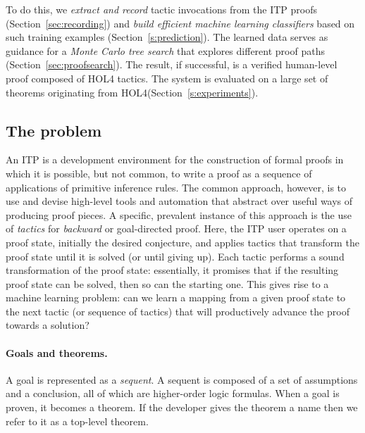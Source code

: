 \documentclass[runningheads,a4paper,draft]{svjour3}
\def\holfour{\textsf{HOL4}\xspace}
\begin{document}
  To do this, we \emph{extract and record} tactic invocations from the ITP
  proofs (Section~\ref{sec:recording}) and
  \emph{build efficient machine learning classifiers} based on such training
  examples (Section~\ref{s:prediction}).  The learned data serves as
  guidance for a \emph{Monte Carlo tree search} that explores different
  proof paths (Section~\ref{sec:proofsearch}). The result, if
  successful, is a verified human-level proof composed of \holfour
  tactics.  The system is evaluated on a large set of theorems originating
  from \holfour (Section~\ref{s:experiments}).

\subsection{The problem}
An ITP is a development environment for the construction of formal proofs in which it is possible, but not common, to write a proof as a sequence of applications of primitive inference rules.
The common approach, however, is to use and devise high-level tools and automation that abstract over useful ways of producing proof pieces.
A specific, prevalent instance of this approach is the use of \emph{tactics} for \emph{backward} or goal-directed proof.
Here, the ITP user operates on a proof state, initially the desired conjecture, and applies tactics that transform the proof state until it is solved (or until giving up).
Each tactic performs a sound transformation of the proof state: essentially, it promises that if the resulting proof state can be solved, then so can the starting one.
This gives rise to a machine learning problem: can we learn a mapping from a given proof state to the next tactic (or sequence of tactics) that will productively advance the proof towards a solution?

\paragraph{Goals and theorems.}
A goal is represented as a \emph{sequent}.
A sequent is composed of a set of assumptions and a conclusion, all of which are higher-order logic formulas.
When a goal is proven, it becomes a theorem.
If the developer gives the theorem a name then we refer to it as a top-level theorem.
\end{document}
